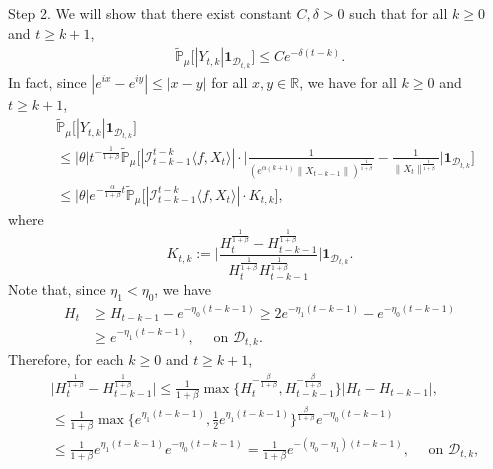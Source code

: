 \documentclass[12pt,a4paper]{amsart}
\theoremstyle{plain}
\theoremstyle{definition}
\numberwithin{equation}{section}
\begin{document}
    Step 2. We will show that there exist constant $C,\delta > 0$ such that for all $k\geq 0$ and $t\geq k+1$,
\begin{equation}\begin{split}
\label{thm122}
     \mathbb{\tilde{P}}_{\mu}\big[|Y_{t,k}|\mathbf{1}_{\mathcal{D}_{t,k}}\big]
     \leq  C e^{-\delta (t-k)}.
\end{split}\end{equation}
    In fact, since $|e^{ix}-e^{iy}|\leq|x-y|$ for all $x,y\in \mathbb R$, we have for all $k \geq 0$ and $t\geq k+1$,
\begin{equation}\begin{split}
\label{eq: control of Ykt}
        &\mathbb{\tilde{P}}_{\mu}\big[|Y_{t,k}|\mathbf{1}_{\mathcal{D}_{t,k}}\big]
        \\&\leq|\theta|t^{-\frac{1}{1+\beta}} \mathbb{\tilde{P}}_{\mu}\bigg[|\mathcal I_{t-k-1}^{t-k}\langle f ,X_t\rangle|\cdot\Big|\frac{1}{(e^{\alpha(k+1)}\|X_{t-k-1}\|)^{\frac{1}{1+\beta}}}-\frac{1}{\|X_t\|^{\frac{1}{1+\beta}}}\Big|\mathbf{1}_{\mathcal{D}_{t,k}}\bigg]
        \\&\leq |\theta| e^{-\frac{\alpha}{1+\beta}t}\mathbb{\tilde{P}}_{\mu}\big[|\mathcal I_{t-k-1}^{t-k}\langle f ,X_t\rangle|\cdot K_{t,k}\big],
\end{split}\end{equation}
    where
\begin{equation}
\label{def: Ktk}
    K_{t,k}
    :=\Big|\frac{H_t^{\frac{1}{1+\beta}}-H_{t-k-1}^{\frac{1}{1+\beta}}}{H_t^{\frac{1}{1+\beta}}H_{t-k-1}^{\frac{1}{1+\beta}}}\Big|\mathbf{1}_{\mathcal{D}_{t,k}}.
\end{equation}
    Note that, since $\eta_1 < \eta_0$, we have
\begin{align*}
    H_t
    &\geq H_{t-k-1}- e^{-\eta_0(t-k-1)}
    \geq 2e^{-\eta_1(t-k-1)}-e^{-\eta_0(t-k-1)}
    \\&\geq e^{-\eta_1(t-k-1)},
    \quad \text{ on } \mathcal D_{t,k}.
\end{align*}
    Therefore, for each $k \geq 0$ and $t\geq k+1$,
\begin{align*}
     &\Big|H_t^{\frac{1}{1+\beta}}-H_{t-k-1}^{\frac{1}{1+\beta}}\Big|
     \leq \frac{1}{1+\beta}\max \Big\{H_t^{-\frac{\beta}{1+\beta}},H_{t-k-1}^{-\frac{\beta}{1+\beta}}\Big\}\left|H_t-H_{t-k-1}\right|,
    \\&\leq \frac{1}{1+\beta} \max\{e^{\eta_1 (t-k-1)}, \frac{1}{2}e^{\eta_1(t-k-1)}\}^{\frac{\beta}{1+\beta}}e^{-\eta_0(t-k-1)}
    \\&\leq \frac{1}{1+\beta} e^{\eta_1 (t-k-1)} e^{-\eta_0(t-k-1)}
    =\frac{1}{1+\beta}  e^{-(\eta_0 - \eta_1)(t-k-1)},
    \quad \text{ on } \mathcal D_{t,k},
\end{align*}
\end{document}
